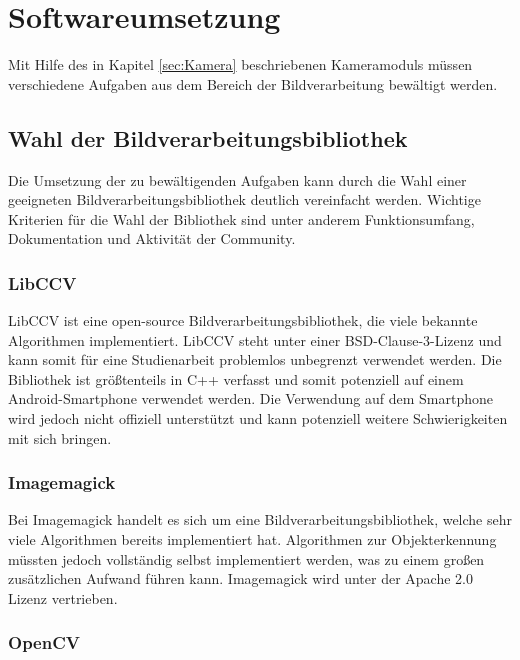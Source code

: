 \chapter{Softwareumsetzung}
\label{cha:Software}

Mit Hilfe des in Kapitel \ref{sec:Kamera} beschriebenen Kameramoduls müssen verschiedene Aufgaben aus dem Bereich der Bildverarbeitung bewältigt werden. 

\section{Wahl der Bildverarbeitungsbibliothek}

Die Umsetzung der zu bewältigenden Aufgaben kann durch die Wahl einer geeigneten Bildverarbeitungsbibliothek deutlich vereinfacht werden. Wichtige Kriterien für die Wahl der Bibliothek sind unter anderem Funktionsumfang, Dokumentation und Aktivität der Community.

\subsection{LibCCV}

LibCCV \cite{libccv} ist eine open-source Bildverarbeitungsbibliothek, die viele bekannte Algorithmen implementiert. LibCCV steht unter einer BSD-Clause-3-Lizenz und kann somit für eine Studienarbeit problemlos unbegrenzt verwendet werden. Die Bibliothek ist größtenteils in C++ verfasst und somit potenziell auf einem Android-Smartphone verwendet werden. Die Verwendung auf dem Smartphone wird jedoch nicht offiziell unterstützt und kann potenziell weitere Schwierigkeiten mit sich bringen.

\subsection{Imagemagick}

Bei Imagemagick \cite{imagemagick} handelt es sich um eine Bildverarbeitungsbibliothek, welche sehr viele Algorithmen bereits implementiert hat. Algorithmen zur Objekterkennung müssten jedoch vollständig selbst implementiert werden, was zu einem großen zusätzlichen Aufwand führen kann. Imagemagick wird unter der Apache 2.0 Lizenz vertrieben.

\subsection{OpenCV}
\label{subsec:opencv}

